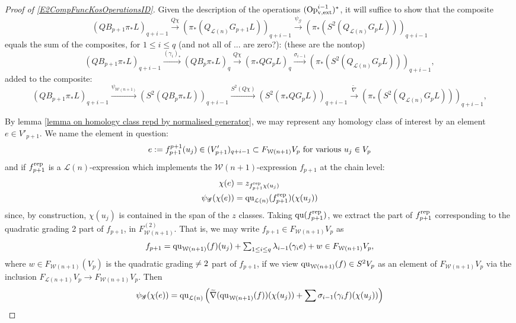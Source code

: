\documentclass[11pt]{amsart}
\theoremstyle{plain}
\theoremstyle{definition}
\renewcommand{\to}{\longrightarrow}
\newcommand{\scrQ}{\mathscr{Q}}
\newcommand{\scrR}{\mathscr{R}}
\newcommand{\scrT}{\mathscr{T}}
\newcommand{\scrY}{\mathscr{Y}}
\newcommand{\scrI}{\mathscr{I}}
\newcommand{\scrO}{\mathscr{O}}
\newcommand{\scrP}{\mathscr{P}}
\newcommand{\scrS}{\mathscr{S}}
\newcommand{\scrG}{\mathscr{G}}
\newcommand{\scrH}{\mathscr{H}}
\newcommand{\scrJ}{\mathscr{J}}
\newcommand{\scrK}{\mathscr{K}}
\newcommand{\scrL}{\mathscr{L}}
\newcommand{\scrZ}{\mathscr{Z}}
\newcommand{\scrN}{\mathscr{N}}
\newcommand{\scrM}{\mathscr{M}}
\newcommand{\calW}{\mathcal{W}}
\newcommand{\calL}{\mathcal{L}}
\theoremstyle{plain}
\newcommand{\BSW}{{\scrG}}%
\newcommand{\quadratic}{\textup{qu}}
\newcommand{\vExtCohOp}{\textup{Op}_\textup{v,ext}}
\begin{document}
\begin{Composite functor spectral sequences}
\begin{proof}[Proof of \ref{E2CompFuncKosOperationsID}]
Given the description of the operations $(\vExtCohOp^{i-1})^*$, it will suffice to show that the composite
\[(QB_{p+1}\pi_*L)_{q+i-1}\overset{Q\chi}{\to}(\pi_*(Q_{\calL(n)}G_{p+1}L))_{q+i-1}\overset{\psi_{\BSW}}{\to}(\pi_*(S^2(Q_{\calL(n)}G_pL)))_{q+i-1}\]
equals the sum of the composites, for $1\leq i \leq q$ (and not all of ... are zero?): (these are the nontop)
\[(QB_{p+1}\pi_* L)_{q+i-1}\overset{(\gamma_i)_*}{\to} (QB_{p}\pi_* L)_q\overset{Q\chi}{\to} (\pi_*QG_{p}L)_q\overset{\sigma_{i-1}}{\to} (\pi_*(S^2(Q_{\calL(n)}G_{p}L)))_{q+i-1},\]
added to the composite:
\[(QB_{p+1}\pi_* L)_{q+i-1}\overset{\psi_{\calW(n+1)}}{\to}(S^2(QB_{p}\pi_* L))_{q+i-1}\overset{S^2(Q\chi)}{\to}
(S^2(\pi_*QG_pL))_{q+i-1}\overset{\widetilde{\nabla}}{\to}
(\pi_*(S^2(Q_{\calL(n)}G_{p}L)))_{q+i-1},\]


By lemma \ref{lemma on homology class repd by normalised generator}, we may represent any homology class of interest by an element $e\in V'_{p+1}$. We name the element in question:
\[e:=f^{p+1}_{p+1}(u_j)\in (V'_{p+1})_{q+i-1}\subset F_{\calW(n+1)}V_p\textup{ for various }u_j\in V_{p}\]
and if $f_{p+1}^\textup{rep}$ is a $\calL(n)$-expression which implements the $\calW(n+1)$-expression $f_{p+1}$ at the chain level:
\begin{alignat*}{2}
\chi(e)&=z_{f_{p+1}^\textup{rep}\chi(u_j)}\\
\psi_{\BSW}(\chi(e))&=\quadratic_{\calL(n)}(f_{p+1}^\textup{rep})(\chi(u_j))
\end{alignat*}
since, by construction, $\chi(u_j)$ is contained in the span of the $z$ classes.  Taking $\quadratic(f_{p+1}^\textup{rep})$, we extract the part of $f_{p+1}^\textup{rep}$ corresponding to the quadratic grading 2 part of $f_{p+1}$, in $F_{\calW(n+1)}^{(2)}$. That is, we may write $f_{p+1}\in F_{\calW(n+1)}V_p$ as
\[f_{p+1}=\quadratic_{\calW(n+1)}(f)(u_j)+\textstyle\sum_{1\leq i\leq q} \lambda_{i-1}(\gamma_ie) + w\in F_{\calW(n+1)}V_p,\]
where $w\in F_{\calW(n+1)}(V_p)$ is the quadratic grading$\makebox[0cm][l]{}\neq2$ part of $f_{p+1}$, if we view $\quadratic_{\calW(n+1)}(f)\in S^2V_p$ as an element of $F_{\calW(n+1)}V_p$ via the inclusion $F_{\calL(n+1)}V_p\to F_{\calW(n+1)}V_p$. Then
\begin{alignat*}{2}
\psi_\BSW(\chi(e))&=\quadratic_{\calL(n)} \left(\widetilde{\nabla}(\quadratic_{\calW(n+1)}(f))(\chi(u_j))+\sum \sigma_{i-1}(\gamma_if)(\chi(u_j))\right)\\

\end{alignat*}
\end{proof}
\end{Composite functor spectral sequences}
\end{document}
